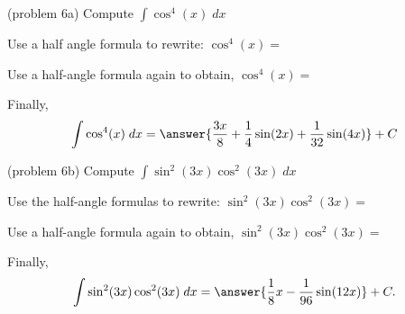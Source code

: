\documentclass{ximera}
\begin{document}
\begin{problem}(problem 6a)
Compute $\displaystyle{\int \cos^4(x) \; dx}$


Use a half angle formula to rewrite: $\cos^4(x)=$

\begin{multipleChoice}
\end{multipleChoice}

Use a half-angle formula again to obtain, $\cos^4(x) = $

\begin{multipleChoice}
\end{multipleChoice}

Finally,
\[
\int \cos^4(x) \; dx = \answer{\frac{3x}{8} +\frac14 \sin(2x) + \frac{1}{32}\sin(4x)} + C
\]
\end{problem}



\begin{problem}(problem 6b)
Compute $\displaystyle{\int \sin^2(3x)\cos^2(3x) \; dx}$


Use the half-angle formulas to rewrite: $\sin^2(3x) \cos^2(3x)=$

\begin{multipleChoice}
\end{multipleChoice}

Use a half-angle formula again to obtain, $\sin^2(3x) \cos^2(3x)=$

\begin{multipleChoice}
\end{multipleChoice}

Finally,
\[
\int \sin^2(3x)\cos^2(3x) \; dx = \answer{\frac18 x - \frac{1}{96} \sin(12x)} + C.
\]

\end{problem}


\end{document}
